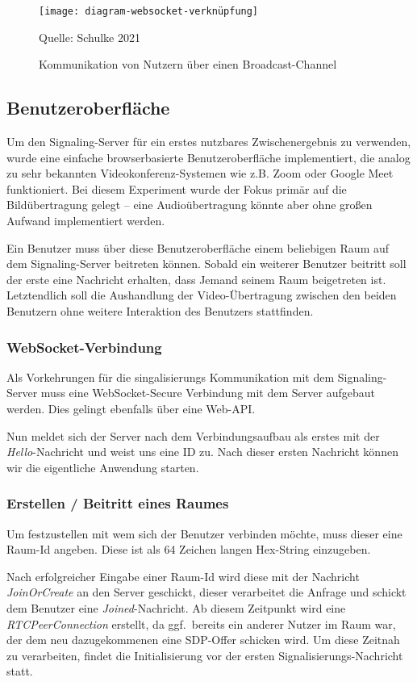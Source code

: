 \documentclass{article}
\newcommand{\figuresource}[1]{
	\begin{center}Quelle: #1\end{center}
}
\begin{document}
\begin{onecolumn}
\begin{figure}[ht!]
	\texttt{[image: diagram-websocket-verknüpfung]}
	\centering
	\caption{Kommunikation von Nutzern über einen Broadcast-Channel}\label{fig:broadcast-usage}
	\figuresource{Schulke 2021}
\end{figure}

\subsection{Benutzeroberfläche}

Um den Signaling-Server für ein erstes nutzbares Zwischenergebnis zu verwenden,
wurde eine einfache browserbasierte Benutzeroberfläche implementiert, die
analog zu sehr bekannten Videokonferenz-Systemen wie z.B. Zoom oder Google Meet
funktioniert. Bei diesem Experiment wurde der Fokus primär auf die
Bildübertragung gelegt – eine Audioübertragung könnte aber ohne großen Aufwand
implementiert werden.

Ein Benutzer muss über diese Benutzeroberfläche einem beliebigen Raum auf dem
Signaling-Server beitreten können. Sobald ein weiterer Benutzer beitritt soll
der erste eine Nachricht erhalten, dass Jemand seinem Raum beigetreten ist.
Letztendlich soll die Aushandlung der Video-Übertragung zwischen den beiden
Benutzern ohne weitere Interaktion des Benutzers stattfinden.

\subsubsection{WebSocket-Verbindung}

Als Vorkehrungen für die singalisierungs Kommunikation mit dem Signaling-Server
muss eine WebSocket-Secure Verbindung mit dem Server aufgebaut werden. Dies
gelingt ebenfalls über eine Web-API.\

Nun meldet sich der Server nach dem Verbindungsaufbau als erstes mit der
\textit{Hello}-Nachricht und weist uns eine ID zu. Nach dieser ersten Nachricht
können wir die eigentliche Anwendung starten.

\subsubsection{Erstellen / Beitritt eines Raumes}

Um festzustellen mit wem sich der Benutzer verbinden möchte, muss dieser
eine Raum-Id angeben. Diese ist als 64 Zeichen langen Hex-String einzugeben.

Nach erfolgreicher Eingabe einer Raum-Id wird diese mit der Nachricht
\textit{JoinOrCreate} an den Server geschickt, dieser verarbeitet die Anfrage
und schickt dem Benutzer eine \textit{Joined}-Nachricht. Ab diesem Zeitpunkt
wird eine \textit{RTCPeerConnection} erstellt, da ggf.\ bereits ein anderer
Nutzer im Raum war, der dem neu dazugekommenen eine SDP-Offer schicken wird.
Um diese Zeitnah zu verarbeiten, findet die Initialisierung vor der ersten
Signalisierungs-Nachricht statt.


\end{onecolumn}
\end{document}
